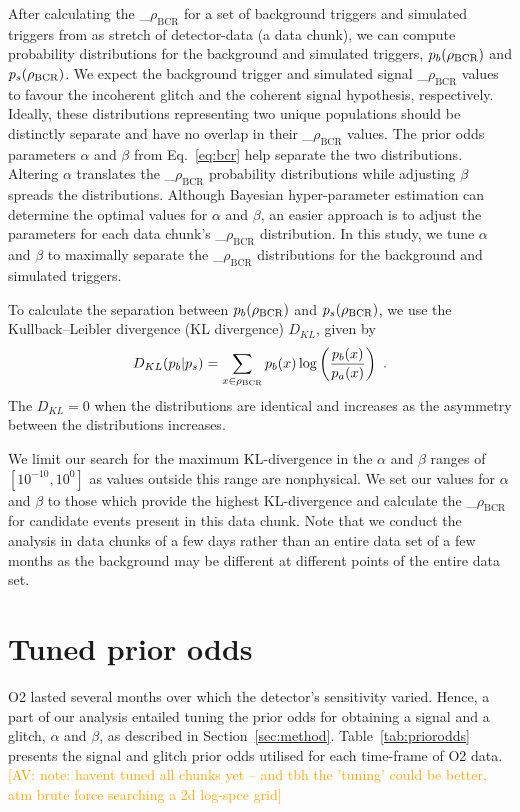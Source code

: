 \documentclass[%
 nofootinbib,
 amsmath,amssymb,
 aps,
 twocolumn
]{revtex4-2}
\newcommand{\mathcmd}[1]{{\sc \relax\ifmmode#1\else $#1$\fi}\xspace}
\newcommand{\bcr}{\mathcmd{\rho_\text{BCR}}}
\newcommand{\avi}[1]{\textcolor{orange}{[AV: #1]}}
\begin{document}
After calculating the \bcr for a set of background triggers and simulated triggers from as stretch of detector-data (a data chunk), we can compute probability distributions for the background and simulated triggers, $p_b(\bcr)$ and $p_s(\bcr)$. We expect the background trigger and simulated signal \bcr values to favour the incoherent glitch and the coherent signal hypothesis, respectively. Ideally, these distributions representing two unique populations should be distinctly separate and have no overlap in their \bcr values. The prior odds parameters $\alpha$ and $\beta$ from Eq.~\ref{eq:bcr} help separate the two distributions. Altering $\alpha$ translates the \bcr probability distributions while adjusting $\beta$ spreads the distributions. Although Bayesian hyper-parameter estimation can determine the optimal values for $\alpha$ and $\beta$, an easier approach is to adjust the parameters for each data chunk's \bcr distribution. In this study, we tune $\alpha$ and $\beta$ to maximally separate the \bcr distributions for the background and simulated triggers. 

To calculate the separation between $p_b(\bcr)$ and $p_s(\bcr)$, we use the Kullback--Leibler divergence (KL divergence) $D_{KL}$, given by
\begin{equation}
    D_{KL}(p_b | p_s) = \sum\limits_{x\in \bcr} p_b(x) \log \left( \frac{p_b(x)}{p_a(x)} \right)  \ .
\end{equation}
The $D_{KL}=0$ when the distributions are identical and increases as the asymmetry between the distributions increases. 

We limit our search for the maximum KL-divergence in the $\alpha$ and $\beta$ ranges of $[10^{-10}, 10^0]$ as values outside this range are nonphysical. We set our values for $\alpha$ and $\beta$ to those which provide the highest KL-divergence and calculate the \bcr for candidate events present in this data chunk. Note that we conduct the analysis in data chunks of a few days rather than an entire data set of a few months as the background may be different at different points of the entire data set.




\section{Tuned prior odds}\label{apdx:alphabeta}

O2 lasted several months over which the detector's sensitivity varied. Hence, a part of our analysis entailed tuning the prior odds for obtaining a signal and a glitch, $\alpha$ and $\beta$, as described in Section~\ref{sec:method}. Table~\ref{tab:priorodds} presents the signal and glitch prior odds utilised for each time-frame of O2 data. \avi{note: havent tuned all chunks yet -- and tbh the 'tuning' could be better, atm brute force searching a 2d log-spce grid}

\end{document}
